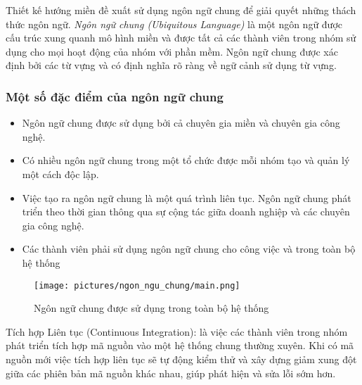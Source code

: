 Thiết kế hướng miền đề xuất sử dụng ngôn ngữ chung để giải quyết những thách thức ngôn ngữ. \emph{Ngôn ngữ chung (Ubiquitous Language)} là một ngôn ngữ được cấu trúc xung quanh mô hình miền và được tất cả các thành viên trong nhóm sử dụng cho mọi hoạt động của nhóm với phần mềm. Ngôn ngữ chung được xác định bởi các từ vựng và có định nghĩa rõ ràng về ngữ cảnh sử dụng từ vựng.

\subsubsection{Một số đặc điểm của ngôn ngữ chung}

\begin{itemize}

\item Ngôn ngữ chung được sử dụng bởi cả chuyên gia miền và chuyên gia công nghệ.

\item Có nhiều ngôn ngữ chung trong một tổ chức được mỗi nhóm tạo và quản lý một cách độc lập.

\item Việc tạo ra ngôn ngữ chung là một quá trình liên tục. Ngôn ngữ chung phát triển theo thời gian thông qua sự cộng tác giữa doanh nghiệp và các chuyên gia công nghệ.

\item Các thành viên phải sử dụng ngôn ngữ chung cho công việc và trong toàn bộ hệ thống

\end{itemize}

\begin{figure}[H]

\centering

\texttt{[image: pictures/ngon\_ngu\_chung/main.png]}

\caption{Ngôn ngữ chung được sử dụng trong toàn bộ hệ thống}

\end{figure}







Tích hợp Liên tục (Continuous Integration): là việc các thành viên trong nhóm phát triển tích hợp mã nguồn vào một hệ thống chung thường xuyên. Khi có mã nguồn mới việc tích hợp liên tục sẽ tự động kiểm thử và xây dựng giảm xung đột giữa các phiên bản mã nguồn khác nhau, giúp phát hiện và sửa lỗi sớm hơn.

